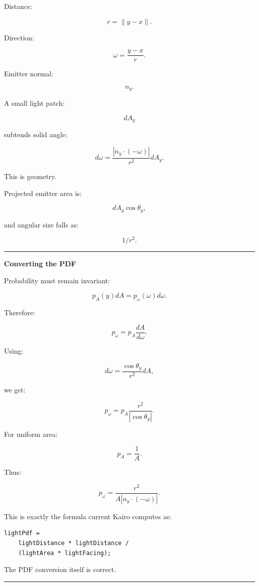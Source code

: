 Distance:

\[
r=\|y-x\|.
\]

Direction:

\[
\omega=
\frac{y-x}{r}.
\]

Emitter normal:

\[
n_y.
\]

A small light patch:

\[
dA_y
\]

subtends solid angle:

\[
\boxed{
d\omega
=
\frac{
|n_y\cdot(-\omega)|
}{
r^2
}
dA_y.
}
\]

This is geometry.

Projected emitter area is:

\[
dA_y\cos\theta_y,
\]

and angular size falls as:

\[
1/r^2.
\]

\begin{center}\rule{0.5\linewidth}{0.5pt}\end{center}

\textbf{Converting the PDF}

Probability must remain invariant:

\[
p_A(y)dA
=
p_\omega(\omega)d\omega.
\]

Therefore:

\[
p_\omega
=
p_A
\frac{dA}{d\omega}.
\]

Using:

\[
d\omega
=
\frac{
\cos\theta_y
}{
r^2
}
dA,
\]

we get:

\[
\boxed{
p_\omega
=
p_A
\frac{
r^2
}{
|\cos\theta_y|
}.
}
\]

For uniform area:

\[
p_A=\frac1A.
\]

Thus:

\[
\boxed{
p_\omega
=
\frac{
r^2
}{
A|n_y\cdot(-\omega)|
}.
}
\]

This is exactly the formula current Kairo computes as:

\begin{verbatim}
lightPdf =
    lightDistance * lightDistance /
    (lightArea * lightFacing);
\end{verbatim}

The PDF conversion itself is correct.

\begin{center}\rule{0.5\linewidth}{0.5pt}\end{center}


